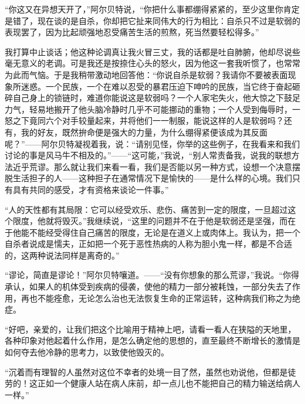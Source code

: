\documentclass[12pt,oneside]{book}
\begin{document}
“你这又在异想天开了，”阿尔贝特说，“你把什么事都绷得紧紧的，至少这里你肯定是错了，现在谈的是自杀，你却把它扯来同伟大的行为相比：自杀只不过是软弱的表现罢了，因为比起顽强地忍受痛苦生活的煎熬，死当然要轻松得多。”

我打算中止谈话；他这种论调真让我火冒三丈，我的话都是吐自肺腑，他却尽说些毫无意义的老调。可是我还是按捺住心头的怒火，因为他这一套我听惯了，也常常为此而气恼。于是我稍带激动地回答他：“你说自杀是软弱？我请你不要被表面现象所迷惑。一个民族，一个在难以忍受的暴君压迫下呻吟的民族，当它终于奋起砸碎自己身上的锁链时，难道你能说这是软弱吗？一个人家宅失火，他大惊之下鼓足力气，轻易地搬开了他头脑冷静时几乎不可能挪动的重物；一个人受到侮辱时，一怒之下竟同六个对手较量起来，并将他们一一制服，能说这样的人是软弱吗？还有，我的好友，既然拚命便是强大的力量，为什么绷得紧便该成为其反面呢？”——阿尔贝特凝视着我，说：“请别见怪，你举的这些例子，在我看来和我们讨论的事是风马牛不相及的。”——“这可能，”我说，“别人常责备我，说我的联想方法近乎荒谬。那么就让我们来看一看，我们是否能以另一种方式，设想一个决意摆脱生活担子的人——这种担子在通常情况下是愉快的——是什么样的心境。我们只有具有共同的感受，才有资格来谈论一件事。”

“人的天性都有其局限：它可以经受欢乐、悲伤、痛苦到一定的限度，一旦超过这个限度，他就将毁灭。”我继续说，“这里的问题并不在于他是软弱还是坚强，而在于他能不能经受得住自己痛苦的限度，无论是在道义上或肉体上。我认为，把一个自杀者说成是懦夫，正如把一个死于恶性热病的人称为胆小鬼一样，都是不合适的，这两种说法同样是离奇的。”

“谬论，简直是谬论！”阿尔贝特嚷道。——“没有你想象的那么荒谬，”我说。“你得承认，如果人的机体受到疾病的侵袭，使他的精力一部分被耗蚀，一部分失去了作用，再也不能痊愈，无论怎么治也无法恢复生命的正常运转，这种病我们称之为绝症。

“好吧，亲爱的，让我们把这个比喻用于精神上吧，请看一看人在狭隘的天地里，各种印象对他起着什么作用，是怎么确定他的思想的，直至最终不断增长的激情是如何夺去他冷静的思考力，以致使他毁灭的。

“沉着而有理智的人虽然对这位不幸者的处境一目了然，虽然也劝说他，但都是徒劳的！这正如一个健康人站在病人床前，却一点儿也不能把自己的精力输送给病人一样。”
\end{document}
